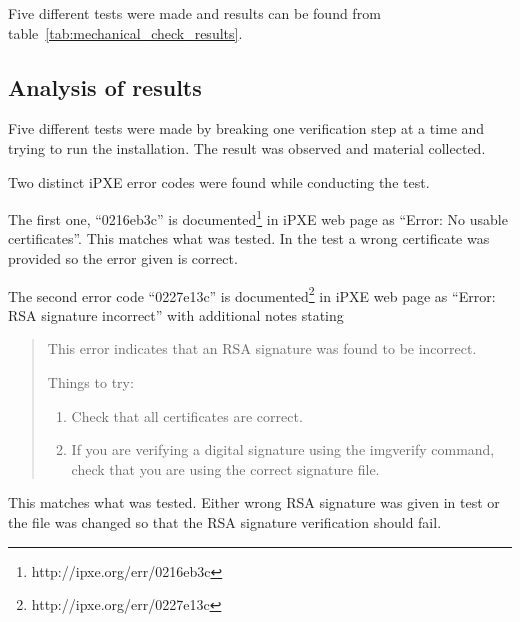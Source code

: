 Five different tests were made and results can be found from
table~\ref{tab:mechanical_check_results}.


\subsection{Analysis of results}

Five different tests were made by breaking one verification step at a
time and trying to run the installation. The result was observed and
material collected.

Two distinct iPXE error codes were found while conducting the
test.

The first one, ``0216eb3c'' is
documented\footnote{http://ipxe.org/err/0216eb3c} in iPXE web page as
``Error: No usable certificates''. This matches what was tested. In
the test a wrong certificate was provided so the error given is
correct.

The second error code ``0227e13c'' is
documented\footnote{http://ipxe.org/err/0227e13c} in iPXE web page as
``Error: RSA signature incorrect'' with additional notes stating

\begin{quote}
This error indicates that an RSA signature was found to be incorrect.

Things to try:

\begin{enumerate}
\item Check that all certificates are correct.
\item If you are verifying a digital signature using the imgverify
  command, check that you are using the correct signature file.
\end{enumerate}
\end{quote}

This matches what was tested. Either wrong RSA signature was given in
test or the file was changed so that the RSA signature verification
should fail.
